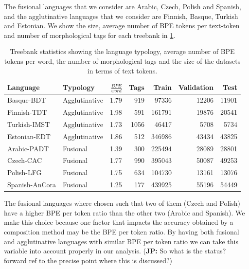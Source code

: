 \documentclass[11pt]{article}
\newcommand\jp[1]{(\textbf{JP:} #1)}
\begin{document}
           	The fusional languages that we consider are Arabic, Czech,
     Polish and Spanish, and the agglutinative languages that we
     consider are Finnish, Basque, Turkish and Estonian.  We show the
     size, average number of BPE tokens per text-token and number of
     morphological tags for each treebank in \cref{tab:data}.
    

    
    
    	\begin{table} %
		\centering
		\begin{tabular}{l|lrrrrr}
			Language & Typology & $\frac{BPE}{word}$ & Tags & Train & Validation & Test \\
			\hline
			Basque-BDT      & Agglutinative & 1.79 & 919 & 97336 & 12206 & 11901 \\
			Finnish-TDT     & Agglutinative & 1.98 & 591 & 161791 & 19876 & 20541 \\
			Turkish-IMST    & Agglutinative & 1.73 & 1056 & 46417 & 5708 & 5734 \\
			Estonian-EDT    & Agglutinative & 1.86 & 512 & 346986 & 43434 & 43825 \\
            Arabic-PADT     & Fusional & 1.39 & 300 & 225494 & 28089 & 28801  \\
			Czech-CAC       & Fusional & 1.77 & 990 & 395043 & 50087 & 49253 \\
			Polish-LFG      & Fusional & 1.75 & 634 & 104730 & 13161 & 13076 \\
			Spanish-AnCora  & Fusional & 1.25 & 177 & 439925 & 55196 & 54449 \\
        \end{tabular}
    		\caption{\label{tab:data} Treebank statistics showing the
     language typology, average number of BPE tokens per word, the
     number of morphological tags and the size of the datasets in
     terms of text tokens.}
	\end{table}
    
        The fusional languages where chosen such that two of them
        (Czech and Polish) have a higher BPE per token ratio than the
        other two (Arabic and Spanish). We make this choice because
        one factor that impacts the accuracy obtained by a composition
        method may be the BPE per token ratio.  By having both
        fusional and agglutinative languages with similar BPE per
        token ratio we can take this variable into account properly in
        our analysis.
        \jp{So what is the status? forward ref to the precise point where this is discussed?}
        
\end{document}
